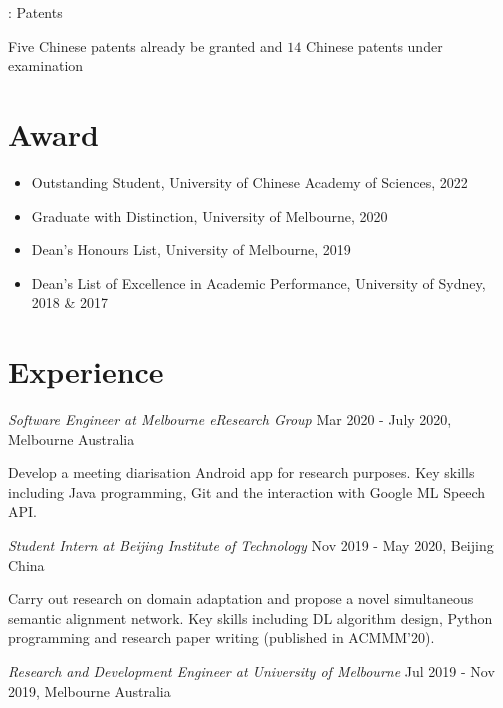 \documentclass[letterpaper,11pt]{article}
\newcommand{\RNum}[1]{\uppercase\expandafter{\romannumeral #1\relax}}
\begin{document}
\RNum{3}: Patents

\vspace{8pt}

\hspace{6pt} Five Chinese patents already be granted and $14$ Chinese patents under examination

\vspace{1pt}

\section{Award}
\begin{itemize}
  \item Outstanding Student, University of Chinese Academy of Sciences, 2022
  \item Graduate with Distinction, University of Melbourne, 2020
  \item Dean's Honours List, University of Melbourne, 2019
  \item Dean's List of Excellence in Academic Performance, University of Sydney, 2018 \& 2017
\end{itemize}

\vspace{1pt}

\section{Experience}

\textit{Software Engineer at Melbourne eResearch Group} \hfill Mar 2020 - July 2020, Melbourne Australia

Develop a meeting diarisation Android app for research purposes. Key skills including Java programming, Git and the interaction with Google ML Speech API. 

\vspace{9pt}

\textit{Student Intern at Beijing Institute of Technology} \hfill Nov 2019 - May 2020, Beijing China

Carry out research on domain adaptation and propose a novel simultaneous semantic alignment network. Key skills including DL algorithm design, Python programming and research paper writing (published in ACMMM'20). 

\vspace{9pt}

\textit{Research and Development Engineer at University of Melbourne} \hfill Jul 2019 - Nov 2019, Melbourne Australia
\end{document}
